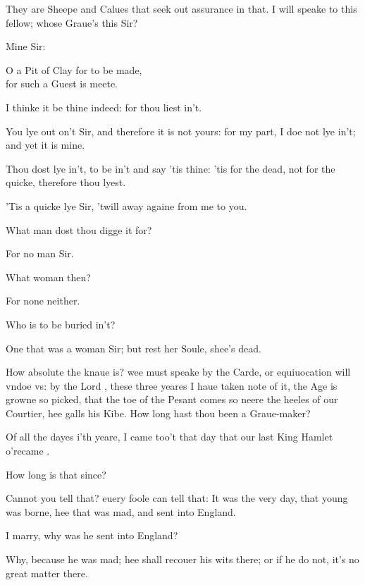 \documentclass[a5paper,DIV=calc,11pt]{scrbook}
\begin{document}
\begin{drama*}
    \hamspeaks They are Sheepe and Calues that seek out assurance in that. I will speake to this fellow; whose Graue's this Sir?
    
     Mine Sir:\\
    \hspace{2em}\parbox{18em}{O a Pit of Clay for to be made,\\
    for such a Guest is meete.}
    
    \hamspeaks I thinke it be thine indeed: for thou liest in't.
    
     You lye out on't Sir, and therefore it is not yours: for my part, I doe not lye in't; and yet it is mine.
    
    \hamspeaks Thou dost lye in't, to be in't and say 'tis thine: 'tis for the dead, not for the quicke, therefore thou lyest.
    
     'Tis a quicke lye Sir, 'twill away againe from me to you.
    
    \hamspeaks What man dost thou digge it for?
    
     For no man Sir.
    
    \hamspeaks What woman then?
    
     For none neither.
    
    \hamspeaks Who is to be buried in't?
    
     One that was a woman Sir; but rest her Soule, shee's dead.
    
    \hamspeaks How absolute the knaue is? wee must speake by the Carde, or equiuocation will vndoe vs: by the Lord \hor, these three yeares I haue taken note of it, the Age is growne so picked, that the toe of the Pesant comes so neere the heeles of our Courtier, hee galls his Kibe. How long hast thou been a Graue-maker?
    
     Of all the dayes i'th yeare, I came too't that day that our last King Hamlet o'recame \for.
    
    \hamspeaks How long is that since?
    
     Cannot you tell that? euery foole can tell that: It was the very day, that young \ham was borne, hee that was mad, and sent into England.
    
    \hamspeaks I marry, why was he sent into England?
    
     Why, because he was mad; hee shall recouer his wits there; or if he do not, it's no great matter there.
    

\end{drama*}
\end{document}
